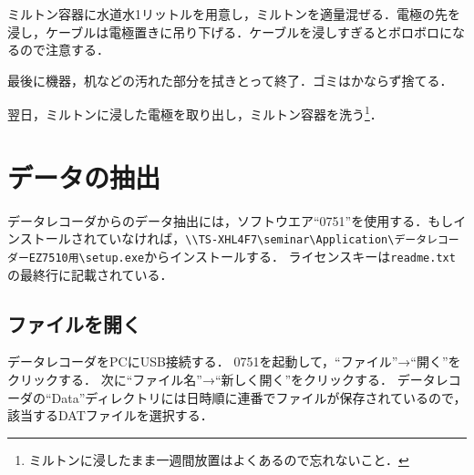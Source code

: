 \documentclass[a4j, twocolumn, openleft, uplatex, dvipdfmx]{jsbook}
\begin{document}
        ミルトン容器に水道水1リットルを用意し，ミルトンを適量混ぜる．電極の先を浸し，ケーブルは電極置きに吊り下げる．ケーブルを浸しすぎるとボロボロになるので注意する．

        最後に機器，机などの汚れた部分を拭きとって終了．ゴミはかならず捨てる．

        翌日，ミルトンに浸した電極を取り出し，ミルトン容器を洗う\footnote{ミルトンに浸したまま一週間放置はよくあるので忘れないこと．}．

    \chapter{データの抽出}
    \label{chap:データの抽出}

    データレコーダからのデータ抽出には，ソフトウエア``0751''を使用する．もしインストールされていなければ，\texttt{\textbackslash\textbackslash TS-XHL4F7\textbackslash seminar\textbackslash Application\textbackslash データレコーダーEZ7510用\textbackslash setup.exe}からインストールする．
    ライセンスキーは\texttt{readme.txt}の最終行に記載されている．

        \section{ファイルを開く}

        データレコーダをPCにUSB接続する．
        0751を起動して，``ファイル''→``開く''をクリックする．
        次に``ファイル名''→``新しく開く''をクリックする．
        データレコーダの``Data''ディレクトリには日時順に連番でファイルが保存されているので，
        該当するDATファイルを選択する．
\end{document}

